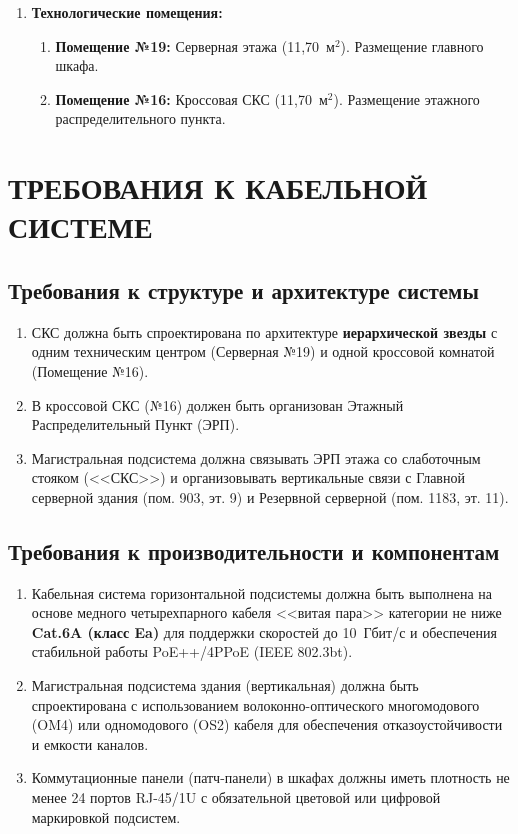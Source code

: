 \documentclass[a4paper,oneside,14pt]{extreport}
\begin{document}
\begin{enumerate}[label=\thesection.\arabic*]
    \item \textbf{Технологические помещения:}
    \begin{enumerate}[label=\thesection.\arabic{enumi}.\arabic*]
        \item \textbf{Помещение №19:} Серверная этажа (11,70~м$^2$). Размещение главного шкафа.
        \item \textbf{Помещение №16:} Кроссовая СКС (11,70~м$^2$). Размещение этажного распределительного пункта.
    \end{enumerate}
\end{enumerate}


\chapter{ТРЕБОВАНИЯ К КАБЕЛЬНОЙ СИСТЕМЕ}

\section{Требования к структуре и архитектуре системы}
\begin{enumerate}[label=\thesection.\arabic*]
    \item СКС должна быть спроектирована по архитектуре \textbf{иерархической звезды} с одним техническим центром (Серверная №19) и одной кроссовой комнатой (Помещение №16).
    \item В кроссовой СКС (№16) должен быть организован Этажный Распределительный Пункт (ЭРП).
    \item Магистральная подсистема должна связывать ЭРП этажа со слаботочным стояком (<<СКС>>) и организовывать вертикальные связи с Главной серверной здания (пом. 903, эт. 9) и Резервной серверной (пом. 1183, эт. 11).
\end{enumerate}

\section{Требования к производительности и компонентам}
\begin{enumerate}[label=\thesection.\arabic*]
    \item Кабельная система горизонтальной подсистемы должна быть выполнена на основе медного четырехпарного кабеля <<витая пара>> категории не ниже \textbf{Cat.6A (класс Ea)} для поддержки скоростей до 10~Гбит/с и обеспечения стабильной работы PoE++/4PPoE (IEEE 802.3bt).
    \item Магистральная подсистема здания (вертикальная) должна быть спроектирована с использованием волоконно-оптического многомодового (OM4) или одномодового (OS2) кабеля для обеспечения отказоустойчивости и емкости каналов.
    \item Коммутационные панели (патч-панели) в шкафах должны иметь плотность не менее 24 портов RJ-45/1U с обязательной цветовой или цифровой маркировкой подсистем.
\end{enumerate}
\end{document}
